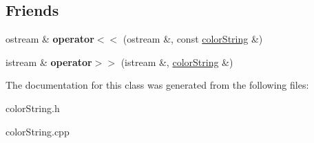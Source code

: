 \subsection*{Friends}
\begin{DoxyCompactItemize}
\item 
\hypertarget{classcolorString_aeb3fb9da4ebc2154f67be0a12dfe584f}{
ostream \& {\bfseries operator$<$$<$} (ostream \&, const \hyperlink{classcolorString}{colorString} \&)}
\label{classcolorString_aeb3fb9da4ebc2154f67be0a12dfe584f}

\item 
\hypertarget{classcolorString_ac506bb1428072ecc0d300dc77ff3ef77}{
istream \& {\bfseries operator$>$$>$} (istream \&, \hyperlink{classcolorString}{colorString} \&)}
\label{classcolorString_ac506bb1428072ecc0d300dc77ff3ef77}

\end{DoxyCompactItemize}


The documentation for this class was generated from the following files:\begin{DoxyCompactItemize}
\item 
colorString.h\item 
colorString.cpp\end{DoxyCompactItemize}
